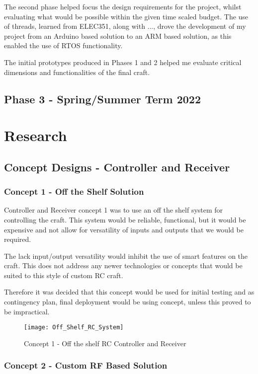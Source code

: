 \documentclass [11pt]{article}
\begin{document}
The second phase helped focus the design requirements for the project, whilst evaluating what would be possible within the given time scaled budget. The use of threads, learned from ELEC351, along with ..., drove the development of my project from an Arduino based solution to an ARM based solution, as this enabled the use of RTOS functionality. 

The initial prototypes produced in Phases 1 and 2 helped me evaluate critical dimensions and functionalities of the final craft.

\subsection{Phase 3 - Spring/Summer Term 2022} 

\section{Research}

\subsection{Concept Designs - Controller and Receiver}
\subsubsection{Concept 1 - Off the Shelf Solution}
Controller and Receiver concept 1 was to use an off the shelf system for controlling the craft. This system would be reliable, functional, but it would be expensive and not allow for versatility of inputs and outputs that we would be required. 

The lack input/output versatility would inhibit the use of smart features on the craft. This does not address any newer technologies or concepts that would be suited to this style of custom RC craft. 

Therefore it was decided that this concept would be used for initial testing and as contingency plan, final deployment would be using concept, unless this proved to be impractical. 

\begin{figure}[H]
\centerline{\texttt{[image: Off\_Shelf\_RC\_System]}}
\caption{Concept 1 - Off the shelf RC Controller and Receiver}
\label{fig:Custom_RC_System}
\end{figure} 


\subsubsection{Concept 2 - Custom RF Based Solution} \label{sec:concept_2}
\end{document}
